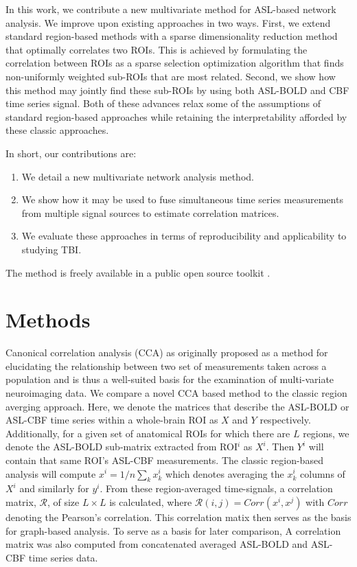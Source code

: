 \documentclass{llncs}
\begin{document}
In this work, we contribute a new multivariate method for ASL-based network analysis.  We improve upon existing approaches in two ways.  First, we extend standard region-based methods with a sparse dimensionality reduction method that optimally correlates two ROIs.  This is achieved by formulating the correlation between ROIs as a sparse selection optimization algorithm that finds non-uniformly weighted sub-ROIs that are most related.  Second, we show how this method may jointly find these sub-ROIs by using both ASL-BOLD and CBF time series signal.  Both of these advances relax some of the assumptions of standard region-based approaches while retaining the interpretability afforded by these classic approaches.  

In short, our contributions are: 
\begin{enumerate}
\item We detail a new multivariate network analysis method.
\item We show how it may be used to fuse simultaneous time series measurements from multiple signal sources to estimate correlation matrices.
\item We evaluate these approaches in terms of reproducibility and applicability to studying TBI. 
\end{enumerate}
The method is freely available in a public open source toolkit \cite{anon}.


\section{Methods}
Canonical correlation analysis (CCA) as originally proposed as a method for elucidating the relationship between two set of measurements taken across a population \cite{Hotelling1936} and is thus a well-suited basis for the examination of multi-variate neuroimaging data.  We compare a novel CCA based method to the classic region averging approach. Here, we denote the matrices that describe the ASL-BOLD or ASL-CBF time series within a whole-brain ROI as $X$ and $Y$ respectively.  Additionally, for a given set of anatomical ROIs for which there are $L$ regions, we denote the ASL-BOLD sub-matrix extracted from ROI$^i$ as $X^i$.  Then $Y^i$ will contain that same ROI's ASL-CBF measurements. The classic region-based analysis will compute $x^i = 1/n \sum_k x^i_k$ which denotes averaging the $x^i_k$ columns of $X^i$ and similarly for $y^i$.  From these region-averaged time-signals, a correlation matrix, $\mathcal{R}$, of size $L \times L$ is calculated, where $\mathcal{R}(i,j)=Corr(x^i,x^j)$ with $Corr$ denoting the Pearson's correlation. This correlation matix then serves as the basis for graph-based analysis. To serve as a basis for later comparison, A correlation matrix was also computed from concatenated averaged ASL-BOLD and ASL-CBF time series data.
\end{document}
